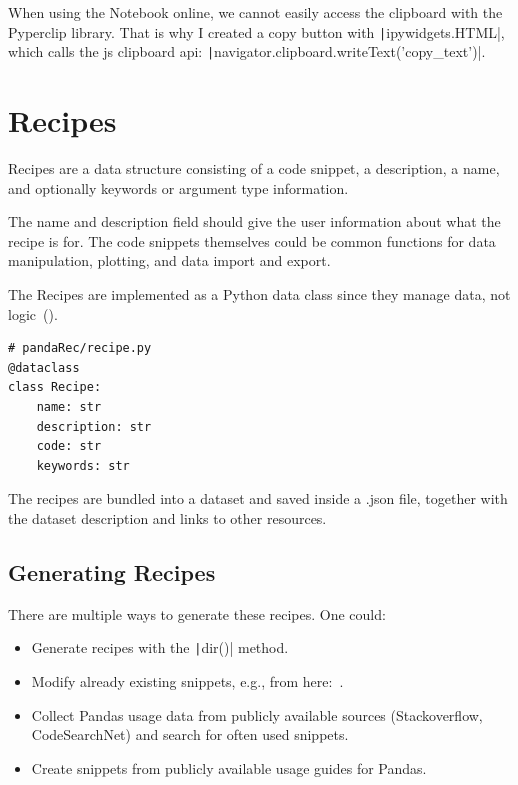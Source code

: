 \documentclass[
     12pt,                    %
     a4paper,             %
     BCOR=10mm,     %
     DIV=14,                 %
     listof=totoc,                    %
     bibliography=totoc,       %
     index=totoc,              %
     twoside,
     headsepline
     ]{scrreprt}
\begin{document}
When using the Notebook online, we cannot easily access the clipboard with the Pyperclip library. That is why I created a copy button with \texttt|ipywidgets.HTML|, which calls the js clipboard api: \texttt|navigator.clipboard.writeText('{copy_text}')|.

\section{Recipes}

Recipes are a data structure consisting of a code snippet, a description, a name, and optionally keywords or argument type information.

The name and description field should give the user information about what the recipe is for.
The code snippets themselves could be common functions for data manipulation, plotting, and data import and export.

The Recipes are implemented as a Python data class since they manage data, not logic~().

\begin{listing}[htb]
\begin{verbatim}
# pandaRec/recipe.py
@dataclass
class Recipe:
	name: str
	description: str
	code: str
	keywords: str
\end{verbatim}
\caption[Recipe Dataclass]{Recipe Dataclass.\label{list:recipeclass}}
\end{listing}

The recipes are bundled into a dataset and saved inside a .json file, together with the dataset description and links to other resources. \label{jsonwhy}

\subsection{Generating Recipes}

There are multiple ways to generate these recipes. One could:

\begin{itemize}
	\item Generate recipes with the \texttt|dir()| method.
	\item Modify already existing snippets, e.g., from here:~\cite{basicpandassnippets}.
	\item Collect Pandas usage data from publicly available sources (Stackoverflow, CodeSearchNet) and search for often used snippets.
	\item Create snippets from publicly available usage guides for Pandas.
\end{itemize}
\end{document}
